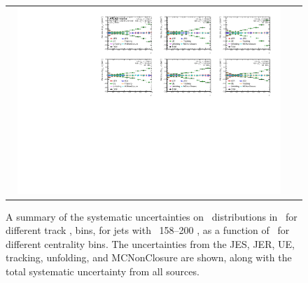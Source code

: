 \begin{figure}
{\begin{tabular}{cc}
	 \includegraphics[page=12, width=0.95\textwidth]{figures_systematics/Summary_ChPS_dR_sys_PbPb_error} \\
\end{tabular} }
   \caption{A summary of the systematic uncertainties on \Dptr\ distributions in \pbpb\ for different track \pt, bins, for jets with \pt\ 158--200  \GeV, as a function of \rvar\ for different centrality bins. The uncertainties from the JES, JER, UE, tracking, unfolding, and MCNonClosure are shown, along with the total systematic uncertainty from all sources. }
      \label{fig:dptr_sys_uncert_A1}
\end{figure}

